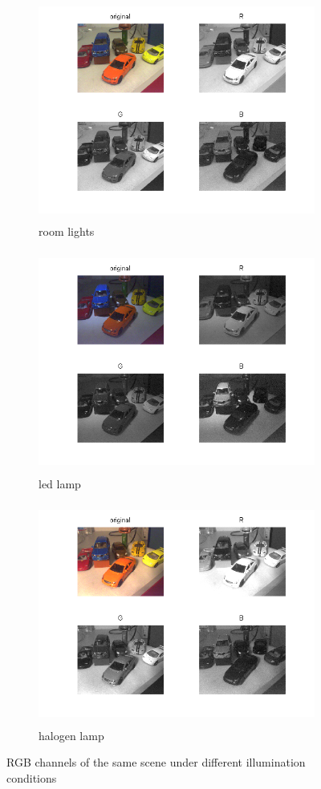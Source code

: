 \documentclass[
a4paper,     %
11pt         %
]{scrartcl}  %
\begin{document}
\newpage
\begin{figure}[ht!]
\centering
\begin{subfigure}{\textwidth}
  \centering
  \includegraphics[trim=60px 40px 60px 0, clip, height=7.3cm]{./Bildg_Messtechnik_Lab/ColorSpaces/html/main_01.png}
  \caption{room lights}
\end{subfigure}
\begin{subfigure}{\textwidth}
  \centering
  \includegraphics[trim=60px 40px 60px 0, clip, height=7.3cm]{./Bildg_Messtechnik_Lab/ColorSpaces/html/main_05.png}
  \caption{led lamp}
\end{subfigure}
\begin{subfigure}{\textwidth}
  \centering
  \includegraphics[trim=60px 40px 60px 0, clip, height=7.3cm]{./Bildg_Messtechnik_Lab/ColorSpaces/html/main_09.png}
  \caption{halogen lamp}
\end{subfigure}
\caption{RGB channels of the same scene under different illumination conditions}
\label{fig:colSpa_RGB}
\end{figure}
\end{document}
